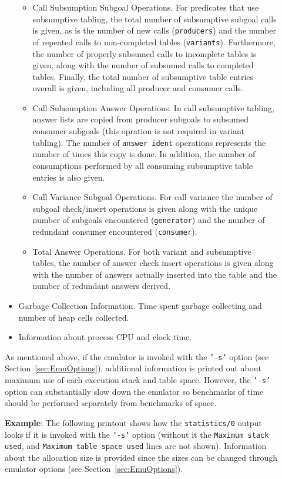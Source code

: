 \begin{description}
\begin{itemize}
\begin{itemize}
\item Call Subsumption Subgoal Operations.  For predicates that use
subsumptive tabling, the total number of subsumptive subgoal calls is
given, as is the number of new calls ({\tt producers}) and the number
of repeated calls to non-completed tables ({\tt variants}).
Furthermore, the number of properly subsumed calls to incomplete
tables is given, along with the number of subsumed calls to completed
tables.  Finally, the total number of subsumptive table entries
overall is given, including all producer and consumer calls.
%
\item Call Subsumption Answer Operations.  In call subsumptive
tabling, answer lists are copied from producer subgoals to subsumed
consumer subgoals (this opration is not required in variant tabling).
The number of {\tt answer ident} operations represents the number of
times this copy is done.  In addition, the number of consumptions
performed by all consuming subsumptive table entries is also given.
%
\item Call Variance Subgoal Operations.  For call variance the number
of subgoal check/insert operations is given along with the unique
number of subgoals encountered ({\tt generator}) and the number of
redundant consumer encountered ({\tt consumer}).
%
\item Total Answer Operations.  For both variant and subsumptive
tables, the number of answer check insert operations is given along
with the number of answers actually inserted into the table and the
number of redundant answers derived.
\end{itemize}
%
\item Garbage Collection Information.  Time spent garbage collecting
and number of heap cells collected.

\item Information about process CPU and clock time.
    \end{itemize}

As mentioned above, if the emulator is invoked with the {\tt '-s'}
    option (see Section~\ref{sec:EmuOptions}), additional information
    is printed out about maximum use of each execution stack and table
    space.  However, the {\tt '-s'} option can substantially slow down
    the emulator so benchmarks of time should be performed separately
    from benchmarks of space.

{\bf Example}: The following printout shows how the {\tt statistics/0}
output looks if it is invoked with the {\tt '-s'} option (without it
the {\tt Maximum stack used}, and {\tt Maximum table space used} lines
are not shown).  Information about the allocation size is provided
since the sizes can be changed through emulator options (see
Section~\ref{sec:EmuOptions}).


\end{description}
